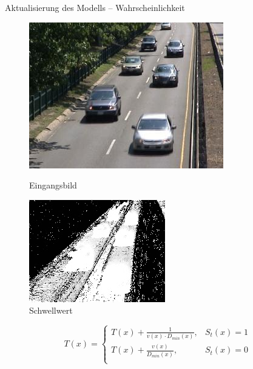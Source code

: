 \documentclass[hyperref={pdfpagelabels=false}]{beamer}
\begin{document}
\begin{frame}[t]{Aktualisierung des Modells -- Wahrscheinlichkeit}
	\vspace{1.65em}
	\begin{figure}
		\centering
		\begin{minipage}{0.45\linewidth}
			\includegraphics[width=1\linewidth]{Abbildungen/Eingang3.jpg}
			\caption*{Eingangsbild}
		\end{minipage}
		\begin{minipage}{0.45\linewidth}
			\includegraphics[width=1\linewidth]{Abbildungen/threshold.jpg}
			\caption*{Schwellwert}
		\end{minipage}
	\end{figure}
	\bigskip
	\begin{equation*}
		T(x)= 	\left\{
				\begin{array}{ll} 
					T(x) + \frac{1}{v(x)\cdot D_{min}(x)}, &  S_t(x) = 1 \\
					T(x) + \frac{v(x)}{D_{min}(x)}, &  S_t(x) = 0 \\
				\end{array}
			\right .
	\end{equation*}
\end{frame}
\end{document}
